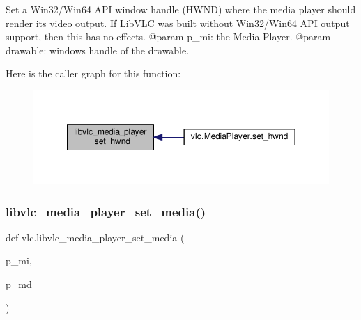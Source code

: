 \begin{DoxyVerb}Set a Win32/Win64 API window handle (HWND) where the media player should
render its video output. If LibVLC was built without Win32/Win64 API output
support, then this has no effects.
@param p_mi: the Media Player.
@param drawable: windows handle of the drawable.
\end{DoxyVerb}
 Here is the caller graph for this function\+:
\nopagebreak
\begin{figure}[H]
\begin{center}
\leavevmode
\includegraphics[width=349pt]{namespacevlc_a7b6f415070dbcd8fc7e50311853bbb26_icgraph}
\end{center}
\end{figure}
\mbox{\label{namespacevlc_ad66d2344f5584cd004b224120ade9077}} 
\subsubsection{\texorpdfstring{libvlc\+\_\+media\+\_\+player\+\_\+set\+\_\+media()}{libvlc\_media\_player\_set\_media()}}
{\footnotesize\ttfamily def vlc.\+libvlc\+\_\+media\+\_\+player\+\_\+set\+\_\+media (\begin{DoxyParamCaption}\item[{}]{p\+\_\+mi,  }\item[{}]{p\+\_\+md }\end{DoxyParamCaption})}

